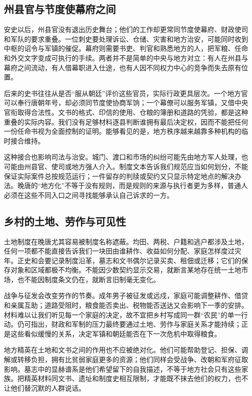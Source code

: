 \subsection{州县官与节度使幕府之间}
安史以后，州县官没有退出历史舞台；他们的工作却更常同节度使幕府、财政使司和军队的要求重叠。一位刺史要处理诉讼、仓储、灾害和地方治安，可能同时收到中枢的诏令与军镇的催促。幕府则需要书吏、判官和熟悉地方的人，把军粮、任命和外交文字变成可执行的手续。两者并不是简单的中央与地方对立：有人在州县与幕府之间流动，有人借幕职进入仕途，也有人因不同权力中心的竞争而失去原有位置。

后来的史书往往从是否“服从朝廷”评价这些官员，实际行政更具层次。一个地方官可以奉行唐朝年号，却必须同节度使协商军饷；一个幕僚可以服务军镇，又借中央官衔取得合法性。文书的格式、印信的使用、仓粮的簿册和道路的凭验，都是这种重叠的实际内容。我们没有足够材料逐县判断谁拥有最后决定权，因而不能把任何一份任命书视为全面控制的证明。能够看见的是，地方秩序越来越靠多种机构的临时接合维持。

这种接合也影响司法与治安。城门、渡口和市场的纠纷可能先由地方军人处理，也可能由州县官、使司或地方强人介入。制度文本告诉我们规范应当如何划分，不能保证实际案件总按规范运行；一件留存的判牍或契约又只显示特定地点的解决办法。晚唐的“地方化”不等于没有规则，而是规则的来源与执行者更为多样，普通人必须在这些不同入口之间寻找能够承认自己诉求的一方。

\subsection{乡村的土地、劳作与可见性}
土地制度在晚唐尤其容易被制度名称遮蔽。均田、两税、户籍和逃户都涉及土地，任何一项都不能直接告诉我们一块田由谁耕作、收益如何分配、家庭怎样度过灾年。正史和会要记录制度沿革，墓志和文书偶尔记录买卖、租佃或迁移；它们的保存对象和区域都极不均衡。不能因少数契约显示交易，就断言某地存在统一土地市场，也不能因制度条文仍在，就断言旧制毫无变化。

战争与征发会改变劳作的节奏。成年男子被征发或远戍，家庭可能调整耕作、借贷和亲属互助；道路受阻时，粮食能否卖出、税物能否送达又会影响下一季的安排。材料难以让我们听见每一个家庭的决定，故不宜把乡村写成同一群“农民”的单一行动。仍可指出，财政和军制的压力最终要通过土地、劳作与家庭关系才能持续；正是这些看似缓慢的关系，决定军镇和朝廷能否在下一次危机中取得粮食。

地方精英在土地和文书之间的作用也不应被绝对化。他们可能帮助登记、担保、调解或转移负担，拥有比贫弱家庭更多的资源；他们同样会受战争、改朝和军府征取影响。墓志中的显赫谱系是他们希望留下的自我描述，不等于地方社会只有这些家族。把精英材料同文书、遗址和制度史相互限制，才能既不抹去他们的权力，也不让他们替沉默的人群说话。


